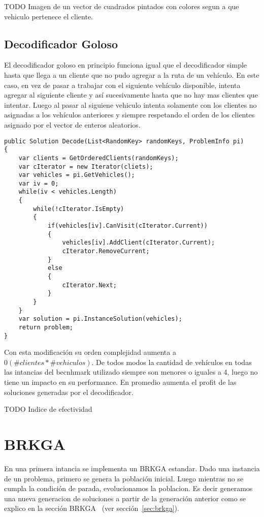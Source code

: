 \bigskip

TODO Imagen de un vector de cuadrados pintados con colores segun a que vehiculo pertenece el cliente.

\subsection{Decodificador Goloso}

El decodificador goloso en principio funciona igual que el decodificador simple hasta que llega a un cliente que no pudo agregar a la ruta de un vehículo. En este caso, en vez de pasar a trabajar con el siguiente vehículo disponible, intenta agregar al siguiente cliente y así sucesivamente hasta que no hay mas clientes que intentar. Luego al pasar al siguiene vehiculo intenta solamente con los clientes no asignadas a los vehículos anteriores y siempre respetando el orden de los clientes asignado por el vector de enteros aleatorios.

\bigskip

\begin{lstlisting} 
public Solution Decode(List<RandomKey> randomKeys, ProblemInfo pi)
{
	var clients = GetOrderedClients(randomKeys);
	var cIterator = new Iterator(cliets);
	var vehicles = pi.GetVehicles();	
	var iv = 0;
	while(iv < vehicles.Length)
	{
		while(!cIterator.IsEmpty)
		{
			if(vehicles[iv].CanVisit(cIterator.Current))
			{
				vehicles[iv].AddClient(cIterator.Current);
				cIterator.RemoveCurrent;
			}
			else
			{
				cIterator.Next;			
			}			
		}
	}
	var solution = pi.InstanceSolution(vehicles);
	return problem;
}
\end{lstlisting}

\bigskip

Con esta modificación su orden complejidad aumenta a $0(\#clientes * \#vehiculos)$. De todos modos la cantidad de vehículos en todas las intancias del becnhmark utilizado siempre son menores o iguales a 4, luego no tiene un impacto en su performance. En promedio aumenta el profit de las soluciones generadas por el decodificador.

\bigskip

TODO Indice de efectividad

\section{BRKGA}

En una primera intancia se implementa un BRKGA estandar. Dado una instancia de un problema, primero se genera la población inicial. Luego mientras no se cumpla la condición de parada, evolucionamos la poblacion. Es decir generamos una nueva generacion de soluciones a partir de la generación anterior como se explico en la sección BRKGA ~(ver sección~\ref{sec:brkga}).


